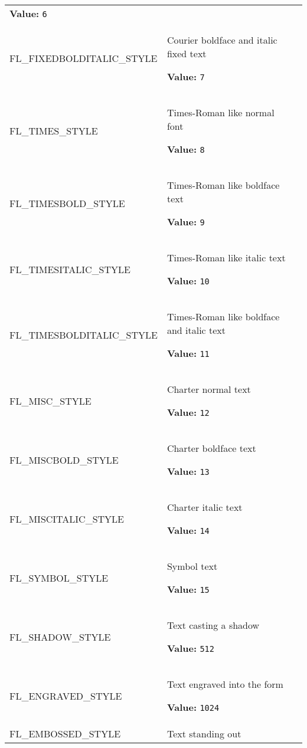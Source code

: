 \begin{longtable}{|p{\varnamewidth}|p{\vardescrwidth}|l}
\textbf{Value:} 
{\tt 6}&\\
\cline{1-2}
\raggedright F\-L\-\_\-F\-I\-X\-E\-D\-B\-O\-L\-D\-I\-T\-A\-L\-I\-C\-\_\-S\-T\-Y\-L\-E\- & \raggedright Courier boldface and italic fixed text

\textbf{Value:} 
{\tt 7}&\\
\cline{1-2}
\raggedright F\-L\-\_\-T\-I\-M\-E\-S\-\_\-S\-T\-Y\-L\-E\- & \raggedright Times-Roman like normal font

\textbf{Value:} 
{\tt 8}&\\
\cline{1-2}
\raggedright F\-L\-\_\-T\-I\-M\-E\-S\-B\-O\-L\-D\-\_\-S\-T\-Y\-L\-E\- & \raggedright Times-Roman like boldface text

\textbf{Value:} 
{\tt 9}&\\
\cline{1-2}
\raggedright F\-L\-\_\-T\-I\-M\-E\-S\-I\-T\-A\-L\-I\-C\-\_\-S\-T\-Y\-L\-E\- & \raggedright Times-Roman like italic text

\textbf{Value:} 
{\tt 10}&\\
\cline{1-2}
\raggedright F\-L\-\_\-T\-I\-M\-E\-S\-B\-O\-L\-D\-I\-T\-A\-L\-I\-C\-\_\-S\-T\-Y\-L\-E\- & \raggedright Times-Roman like boldface and italic text

\textbf{Value:} 
{\tt 11}&\\
\cline{1-2}
\raggedright F\-L\-\_\-M\-I\-S\-C\-\_\-S\-T\-Y\-L\-E\- & \raggedright Charter normal text

\textbf{Value:} 
{\tt 12}&\\
\cline{1-2}
\raggedright F\-L\-\_\-M\-I\-S\-C\-B\-O\-L\-D\-\_\-S\-T\-Y\-L\-E\- & \raggedright Charter boldface text

\textbf{Value:} 
{\tt 13}&\\
\cline{1-2}
\raggedright F\-L\-\_\-M\-I\-S\-C\-I\-T\-A\-L\-I\-C\-\_\-S\-T\-Y\-L\-E\- & \raggedright Charter italic text

\textbf{Value:} 
{\tt 14}&\\
\cline{1-2}
\raggedright F\-L\-\_\-S\-Y\-M\-B\-O\-L\-\_\-S\-T\-Y\-L\-E\- & \raggedright Symbol text

\textbf{Value:} 
{\tt 15}&\\
\cline{1-2}
\raggedright F\-L\-\_\-S\-H\-A\-D\-O\-W\-\_\-S\-T\-Y\-L\-E\- & \raggedright Text casting a shadow

\textbf{Value:} 
{\tt 512}&\\
\cline{1-2}
\raggedright F\-L\-\_\-E\-N\-G\-R\-A\-V\-E\-D\-\_\-S\-T\-Y\-L\-E\- & \raggedright Text engraved into the form

\textbf{Value:} 
{\tt 1024}&\\
\cline{1-2}
\raggedright F\-L\-\_\-E\-M\-B\-O\-S\-S\-E\-D\-\_\-S\-T\-Y\-L\-E\- & \raggedright Text standing out


\end{longtable}
